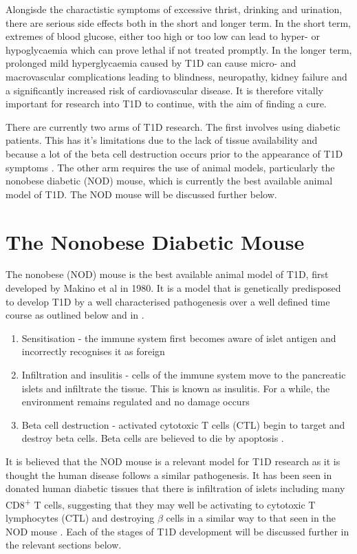 Alongisde the charactistic symptoms of excessive thrist, drinking and urination, there are serious side effects both in the short and longer term.
In the short term, extremes of blood glucose, either too high or too low can lead to hyper- or hypoglycaemia which can prove lethal if not treated promptly.
In the longer term, prolonged mild hyperglycaemia caused by T1D can cause micro- and macrovascular complications leading to blindness, neuropathy, kidney failure and a significantly increased risk of cardiovascular disease\citep{OxClinMed}.
It is therefore vitally important for research into T1D to continue, with the aim of finding a cure.

There are currently two arms of T1D research.
The first involves using diabetic patients.
This has it's limitations due to the lack of tissue availability and because a lot of the beta cell destruction occurs prior to the appearance of T1D symptoms \citep{Thomas2000}.
The other arm requires the use of animal models, particularly the nonobese diabetic (NOD) mouse, which is currently the best available animal model of T1D.
The NOD mouse will be discussed further below.

\section{The Nonobese Diabetic Mouse}

The nonobese (NOD) mouse is the best available animal model of T1D, first developed by Makino et al  in 1980.
It is a model that is genetically predisposed to develop T1D by a well characterised pathogenesis over a well defined time course as outlined below and in .

\begin{enumerate}
\item Sensitisation - the immune system first becomes aware of islet antigen and incorrectly recognises it as foreign
\item Infiltration and insulitis - cells of the immune system move to the pancreatic islets and infiltrate the tissue. This is known as insulitis. For a while, the environment remains regulated and no damage occurs
\item Beta cell destruction - activated cytotoxic T cells (CTL) begin to target and destroy beta cells. Beta cells are believed to die by apoptosis \citep{Cnop2005}.
\end{enumerate}

It is believed that the NOD mouse is a relevant model for T1D research as it is thought the human disease follows a similar pathogenesis.
It has been seen in donated human diabetic tissues that there is infiltration of islets including many CD8\textsuperscript{+} T cells, suggesting that they may well be activating to cytotoxic T lymphocytes (CTL) and destroying $\beta$ cells in a similar way to that seen in the NOD mouse \citep{Hanafusa2008}.
Each of the stages of T1D development will be discussed further in the relevant sections below.



